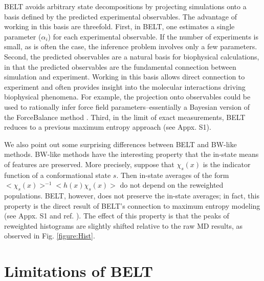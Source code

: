 \documentclass[11pt,titlepage]{article}
\begin{document}
BELT avoids arbitrary state decompositions by projecting simulations onto a basis defined by the predicted experimental observables.  The advantage of working in this basis are threefold. First, in BELT, one estimates a single parameter ($\alpha_i$) for each experimental observable.  If the number of experiments is small, as is often the case, the inference problem involves only a few parameters.  Second, the predicted observables are a natural basis for biophysical calculations, in that the predicted observables are the fundamental connection between simulation and experiment.  Working in this basis allows direct connection to experiment and often provides insight into the molecular interactions driving biophysical phenomena.  For example, the projection onto observables could be used to rationally infer force field parameters--essentially a Bayesian version of the ForceBalance method  \citep{wang2012, wang2013systematic}.  Third, in the limit of exact measurements, BELT reduces to a previous  \citep{chodera2012} maximum entropy approach (see Appx. S1).  

We also point out some surprising differences between BELT and BW-like methods.  BW-like methods have the interesting property that the in-state means of features are preserved.  More precisely, suppose that $\chi_s(x)$ is the indicator function of a conformational state $s$.  Then in-state averages of the form $<\chi_s(x)>^{-1} <h(x) \chi_s(x)>$ do not depend on the reweighted populations.  BELT, however, does not preserve the in-state averages; in fact, this property is the direct result of BELT's connection to maximum entropy modeling (see Appx. S1 and ref.  \citep{chodera2012}).  The effect of this property is that the peaks of reweighted histograms are slightly shifted relative to the raw MD results, as observed in Fig. \ref{figure:Hist}.   

\section*{Limitations of BELT}
\end{document}
